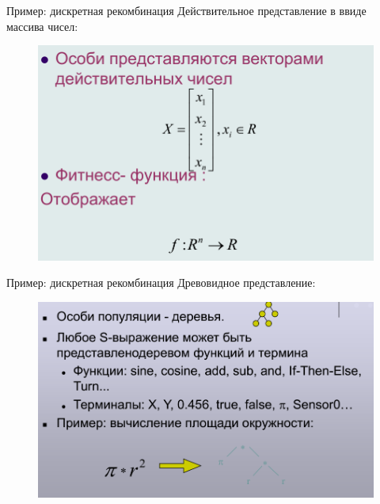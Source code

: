 \documentclass{beamer}
\begin{document}
\begin{frame}{Пример: дискретная рекомбинация}
Действительное представление в ввиде массива чисел:
\begin{figure}[h]
\centering
\includegraphics[scale=0.4]{images/lec04-pic28.png}
\end{figure}
\end{frame}

\begin{frame}{Пример: дискретная рекомбинация}
Древовидное представление:
\begin{figure}[h]
\centering
\includegraphics[scale=0.4]{images/lec04-pic29.png}
\end{figure}
\end{frame}
\end{document}
